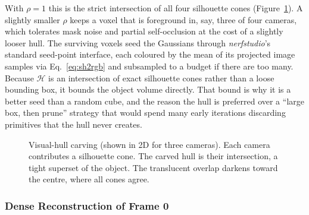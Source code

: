 With $\rho = 1$ this is the strict intersection of all four silhouette cones
(Figure~\ref{fig:visual-hull}). A slightly smaller $\rho$ keeps a voxel that is
foreground in, say, three of four cameras, which tolerates mask noise and partial
self-occlusion at the cost of a slightly looser hull. The surviving voxels seed the
Gaussians through \emph{nerfstudio}'s standard seed-point interface, each coloured by the
mean of its projected image samples via Eq.~\eqref{eq:sh2rgb} and subsampled to a
budget if there are too many. Because $\mathcal{H}$ is an intersection of exact
silhouette cones rather than a loose bounding box, it bounds the object volume
directly. That bound is why it is a better seed than a random cube, and the
reason the hull is preferred over a \enquote{large box, then prune} strategy
that would spend many early iterations discarding primitives that the hull never
creates.

\begin{figure}[t]
    \centering
    
    \caption{Visual-hull carving (shown in 2D for three cameras). Each camera
    contributes a silhouette cone. The carved hull is their intersection, a tight
    superset of the object. The translucent overlap darkens toward the centre, where
    all cones agree.}
    \label{fig:visual-hull}
\end{figure}

\subsubsection{Dense Reconstruction of Frame 0}
\label{sec:frame0}

